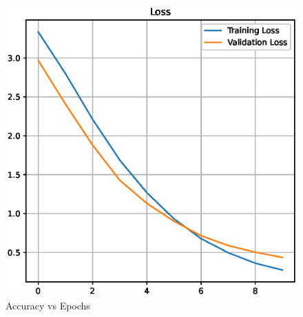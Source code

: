 \documentclass[10pt,twocolumn,letterpaper]{article}
\begin{document}
\begin{figure}[!ht]
    \centering
    \includegraphics[width=\columnwidth]{./Images/Loss.eps}
    \caption{Accuracy vs Epochs}
\end{figure}
\end{document}
